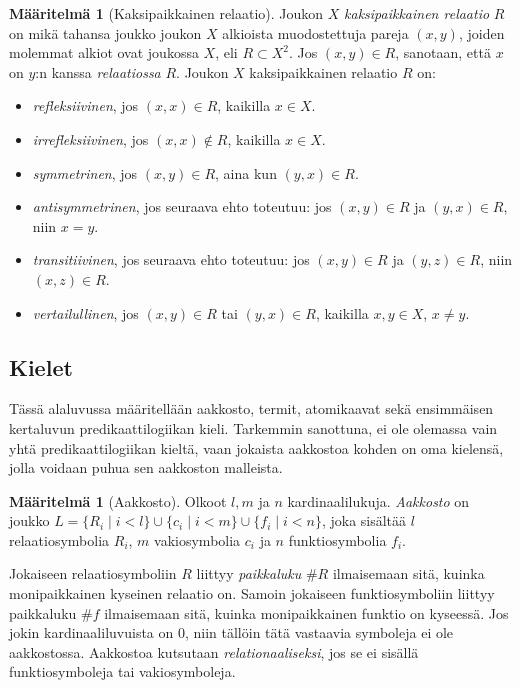 \documentclass[finnish]{tktltiki2}
\theoremstyle{definition}
\newtheorem{maar}[lau]{Määritelmä}
\theoremstyle{remark}
\begin{document}
\begin{maar}[Kaksipaikkainen relaatio]
Joukon $X$ \textit{kaksipaikkainen relaatio} $R$ on mikä tahansa joukko joukon $X$ alkioista muodostettuja pareja $(x, y)$, joiden molemmat alkiot ovat joukossa $X$, eli $R \subset X^2$.  Jos $(x, y) \in R$, sanotaan, että $x$ on $y$:n kanssa \textit{relaatiossa} $R$. Joukon $X$ kaksipaikkainen relaatio $R$ on:
\begin{itemize}
\item \textit{refleksiivinen}, jos $(x, x) \in R$, kaikilla $x \in X$.
\item \textit{irrefleksiivinen}, jos $(x, x) \notin R$, kaikilla $x \in X$.
\item \textit{symmetrinen}, jos $(x, y) \in R$, aina kun $(y, x) \in R$.
\item \textit{antisymmetrinen}, jos seuraava ehto toteutuu: jos $(x, y) \in R$ ja $(y, x) \in R$, niin $x = y$.
\item \textit{transitiivinen}, jos seuraava ehto toteutuu: jos $(x, y) \in R$ ja $(y, z) \in R$, niin $(x, z) \in R$.
\item \textit{vertailullinen}, jos $(x, y) \in R$ tai $(y, x) \in R$, kaikilla $x, y \in X$, $x \neq y$.
\end{itemize}
\end{maar}

\subsection{Kielet}
Tässä alaluvussa määritellään aakkosto, termit, atomikaavat sekä ensimmäisen kertaluvun predikaattilogiikan kieli. Tarkemmin sanottuna, ei ole olemassa vain yhtä predikaattilogiikan kieltä, vaan jokaista aakkostoa kohden on oma kielensä, jolla voidaan puhua sen aakkoston malleista.

\begin{maar}[Aakkosto]
Olkoot $l, m$ ja $n$ kardinaalilukuja. \textit{Aakkosto} on joukko $L = \{R_i \mid i < l\} \cup \{c_i \mid i < m\} \cup \{f_i \mid i < n\}$, joka sisältää $l$ relaatiosymbolia $R_i$, $m$ vakiosymbolia $c_i$ ja $n$ funktiosymbolia $f_i$.
\end{maar}
Jokaiseen relaatiosymboliin $R$ liittyy \textit{paikkaluku} $\#R$ ilmaisemaan sitä, kuinka monipaikkainen kyseinen relaatio on. Samoin jokaiseen funktiosymboliin liittyy paikkaluku $\#f$ ilmaisemaan sitä, kuinka monipaikkainen funktio on kyseessä. Jos jokin kardinaaliluvuista on $0$, niin tällöin tätä vastaavia symboleja ei ole aakkostossa. Aakkostoa kutsutaan \textit{relationaaliseksi}, jos se ei sisällä funktiosymboleja tai vakiosymboleja.
\end{document}
